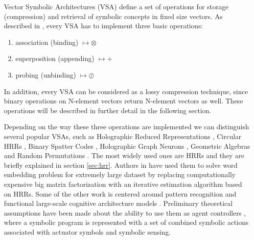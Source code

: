 \documentclass[conference]{IEEEtran}
\begin{document}
	Vector Symbolic Architectures (VSA) define a set of operations for storage (compression) and retrieval of symbolic concepts in fixed size vectors.
As described in \cite{Levy:2008:VectorSymbolicArchitectures}, every VSA has to implement three basic operations:
	\begin{enumerate}
		\item association (binding) $\mapsto \otimes$
		\item superposition (appending) $\mapsto +$
		\item probing (unbinding) $\mapsto \oslash$
	\end{enumerate}
	
	In addition, every VSA can be considered as a lossy compression technique, since binary operations on N-element vectors return N-element vectors as well. These operations will be described in further detail in the following section. 
	
	Depending on the way these three operations are implemented we can distinguish several popular VSAs, such as Holographic Reduced Representations \cite{Plate:1995:HolographicReducedRepresentations}, Circular HRRs \cite{DeVine:2010:Semanticoscillations}, Binary Spatter Codes \cite{Kanerva:1994:SpatterCodeEncoding}, Holographic Graph Neurons \cite{Kleyko:2016:HolographicGraphNeuron}, Geometric Algebras \cite{Patyk-Lonska:2011:DistributedRepresentationsBased} and Random Permutations \cite{Recchia:2015:EncodingSequentialInformation}.
The most widely used ones are HRRs and they are briefly explained in section \ref{sec:hrr}.
Authors in \cite{Golosio:2015:CognitiveNeuralArchitecture} have used them to solve word embedding problem for extremely large dataset by replacing computationally expensive big matrix factorization with an iterative estimation algorithm based on HRRs.
Some of the other work is centered around pattern recognition \cite{Kleyko:2016:PatternRecognitionVector} and functional large-scale cognitive architecture models \cite{Eliasmith:2012:LargeScaleModel}.
Preliminary theoretical assumptions have been made about the ability to use them as agent controllers \cite{Levy:2013:LearningBehaviorHierarchies}, where a symbolic program is represented with a set of combined symbolic actions associated with actuator symbols and symbolic sensing.
	
\end{document}
